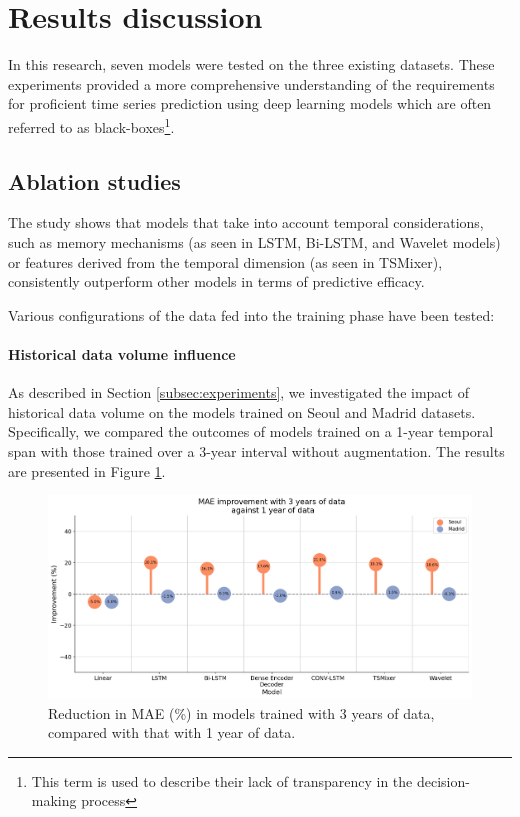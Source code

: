 \section{Results discussion}

In this research, seven models were tested on the three existing datasets. These experiments provided a more comprehensive understanding of the requirements for proficient time series prediction using deep learning models which are often referred to as black-boxes\footnote{This term is used to describe their lack of transparency in the decision-making process}.

\subsection*{Ablation studies}

The study shows that models that take into account temporal considerations, such as memory mechanisms (as seen in LSTM, Bi-LSTM, and Wavelet models) or features derived from the temporal dimension (as seen in TSMixer), consistently outperform other models in terms of predictive efficacy.

Various configurations of the data fed into the training phase have been tested:

\paragraph{Historical data volume influence}

As described in Section \ref{subsec:experiments}, we investigated the impact of historical data volume on the models trained on Seoul and Madrid datasets. Specifically, we compared the outcomes of models trained on a 1-year temporal span with those trained over a 3-year interval without augmentation. The results are presented in Figure \ref{fig:more_data_improv}.

\begin{figure}[h]
    \centering
    \includegraphics[width=1\linewidth]{images/improvement with more data.png}
    \caption{Reduction in MAE (\%) in models trained with 3 years of data, compared with that with 1 year of data.}
    \label{fig:more_data_improv}
\end{figure}

